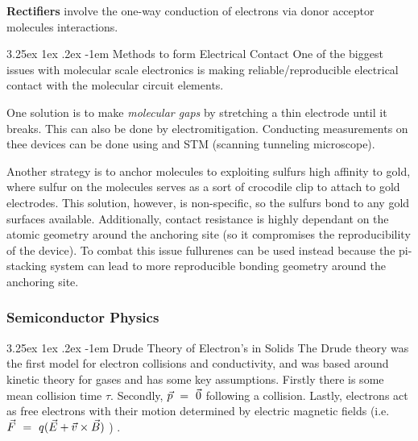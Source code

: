 \documentclass{article}
\makeatletter
\newcounter{subsubsubsection}[subsubsection]
\renewcommand\subparagraph{\@startsection{subparagraph}{6}{\parindent}%
  {3.25ex \@plus1ex \@minus .2ex}%
  {-1em}%
  {\normalfont\normalsize\bfseries}}
\makeatother
\begin{document}
\textbf{Rectifiers} involve the one-way conduction of electrons via donor acceptor molecules interactions.

\subparagraph{Methods to form Electrical Contact}
One of the biggest issues with molecular scale electronics is making reliable/reproducible electrical contact with the molecular circuit elements. 

One solution is to make \textit{molecular gaps} by stretching a thin electrode until it breaks. This can also be done by electromitigation. Conducting measurements on thee devices can be done using and STM (scanning tunneling microscope). 

Another strategy is to anchor molecules to exploiting sulfurs high affinity to gold, where sulfur on the molecules serves as a sort of crocodile clip to attach to gold electrodes. This solution, however, is non-specific, so the sulfurs bond to any gold surfaces available. Additionally, contact resistance is highly dependant on the atomic geometry around the anchoring site (so it compromises the reproducibility of the device). To combat this issue fullurenes can be used instead because the pi-stacking system can lead to more reproducible bonding geometry around the anchoring site. 

\newpage

\subsubsection{Semiconductor Physics}\label{sec:semiconductor-physics}


\subparagraph{Drude Theory of Electron's in Solids}
The Drude theory was the first model for electron collisions and conductivity, and was based around kinetic theory for gases and has some key assumptions. Firstly there is some mean collision time \begin{math} \tau \end{math}. Secondly, \begin{math} \vec{p} \hspace{0.125cm} = \hspace{0.125cm} \vec{0} \end{math} following a collision. Lastly, electrons act as free electrons with their motion determined by electric magnetic fields (i.e. \begin{math} \vec{F} \hspace{0.125cm} = \hspace{0.125cm} q ( \vec{E} + \vec{v} \times \vec{B} ) \end{math} ) . 
\end{document}
